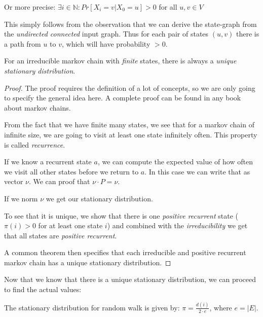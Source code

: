 Or more precise: $\exists i \in \mathbb{N}: Pr[X_i = v | X_0 = u] > 0$
for all $u, v \in V$

This simply follows from the observation that we can derive the
state-graph from the \emph{undirected connected} input graph. Thus for
each pair of states $(u, v)$ there is a path from $u$ to $v$, which will
have probability $> 0$.

\vspace{0.5cm}

\begin{thm}
For an irreducible markov chain with {\em finite} states, there is always a {\em unique stationary distribution}.
\end{thm}

\begin{proof}
The proof requires the definition of a lot of concepts, so we are only going to specify the general idea here.
A complete proof can be found in any book about markov chains.

From the fact that we have finite many states, we see that for a markov chain of infinite size, we are going to visit at least one state
infinitely often. This property is called {\em recurrence}.

If we know a recurrent state $a$, we can compute the expected value of how often we visit all other states before we return to $a$.
In this case we can write that as vector $\nu$. We can proof that $\nu \cdot P = \nu$.

If we norm $\nu$ we get our stationary distribution.

To see that it is unique, we show that there is one {\em positive recurrent} state ($\pi(i) > 0$ for at least one state $i$)
and combined with the {\em irreducibility} we get that all states are {\em positive recurrent}.

A common theorem then specifies that each irreducible and positive recurrent markov chain has a unique stationary distribution.
\end{proof}

Now that we know that there is a unique stationary distribution, we can
proceed to find the actual values:

\vspace{0.5cm}

\begin{thm}
The stationary distribution for random walk is given by: $\pi = \frac{d(i)}{2 \cdot e}$, where $e = |E|$.
\end{thm}

